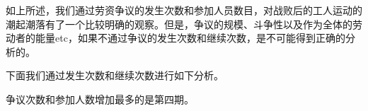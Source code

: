 \documentclass[a4paper,12pt]{article}
\begin{document}
如上所述，我们通过劳资争议的发生次数和参加人员数目，对战败后的工人运动的潮起潮落有了一个比较明确的观察。但是，争议的规模、斗争性以及作为全体的劳动者的能量etc，如果不通过争议的发生次数和继续次数，是不可能得到正确的分析的。

下面我们通过发生次数和继续次数进行如下分析。

争议次数和参加人数增加最多的是第四期。


  
\end{document}
